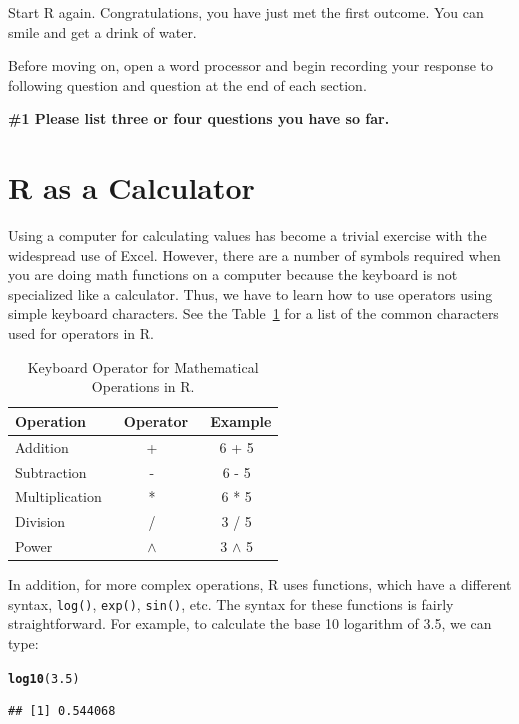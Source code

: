 \documentclass{tufte-handout}\usepackage[]{graphicx}\usepackage[]{color}
\makeatletter
\newcommand{\hlnum}[1]{\textcolor[rgb]{0.686,0.059,0.569}{#1}}%
\newcommand{\hlstd}[1]{\textcolor[rgb]{0.345,0.345,0.345}{#1}}%
\newcommand{\hlkwd}[1]{\textcolor[rgb]{0.737,0.353,0.396}{\textbf{#1}}}%
\newenvironment{kframe}{%
 \def\at@end@of@kframe{}%
 \ifinner\ifhmode%
  \def\at@end@of@kframe{\end{minipage}}%
  \begin{minipage}{\columnwidth}%
 \fi\fi%
 \def\FrameCommand##1{\hskip\@totalleftmargin \hskip-\fboxsep
 \colorbox{shadecolor}{##1}\hskip-\fboxsep
     \hskip-\linewidth \hskip-\@totalleftmargin \hskip\columnwidth}%
 \MakeFramed {\advance\hsize-\width
   \@totalleftmargin\z@ \linewidth\hsize
   \@setminipage}}%
 {\par\unskip\endMakeFramed%
 \at@end@of@kframe}
\newenvironment{knitrout}{}{} %
\makeatother
\begin{document}
Start R again. Congratulations, you have just met the first outcome. You can smile and get a drink of water.

Before moving on, open a word processor and begin recording your response to following question and question at the end of each section.

\bigskip
\noindent \textbf{\#1 Please list three or four questions you have so far. }

\section{R as a Calculator}

Using a computer for calculating values has become a trivial exercise with the widespread use of Excel. However, there are a number of symbols required when you are doing math functions on a computer because the keyboard is not specialized like a calculator. Thus, we have to learn how to use operators using simple keyboard characters. See the Table~\ref{tab:KeyboardOperators} for a list of the common characters used for operators in R.

\begin{table}
	\begin{center}
	\begin{tabular}{lcc}
		\toprule
Operation &\ Operator &\ Example \\
\midrule
Addition & + &  6 + 5  \\  
Subtraction & - & 6 - 5 \\
Multiplication & * & 6 * 5 \\
Division & / & 3 / 5\\
Power & $\wedge$ & 3 $\wedge$ 5  \\
\bottomrule
\end{tabular}
\end{center}	
\caption{Keyboard Operator for Mathematical Operations in R.}
	\label{tab:KeyboardOperators}
\end{table}

In addition, for more complex operations, R uses functions, which have a different syntax, \eg \texttt{log()}, \texttt{exp()}, \texttt{sin()}, etc. The syntax for these functions is fairly straightforward. For example, to calculate the base 10 logarithm of 3.5, we can type:

\begin{knitrout}
\color{fgcolor}\begin{kframe}
\begin{alltt}
\hlkwd{log10}\hlstd{(}\hlnum{3.5}\hlstd{)}
\end{alltt}
\begin{verbatim}
## [1] 0.544068
\end{verbatim}
\end{kframe}
\end{knitrout}
\end{document}
